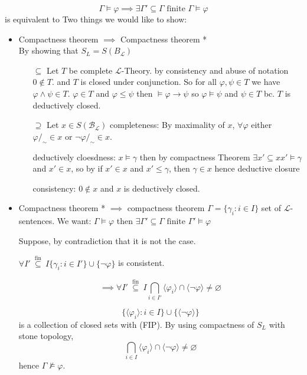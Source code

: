 \[\Gamma \models \varphi \implies \exists \Gamma'\subseteq \Gamma \text{ finite } \Gamma\models \varphi\]
is equivalent to 
Two things we would like to show:
\begin{itemize}
    \item Compactness theorem $\implies$ Compactness theorem *\\
    By showing that $S_L=S(B_\mathcal{L})$
    \begin{claimproof}
        \begin{itemize}
            \item[$\subseteq$] Let $T$ be complete $\mathcal{L}$-Theory. by consistency and abuse of notation $0\notin T$. and $T$ is closed under conjunction.
            So for all $\varphi,\psi\in T$ we have $\varphi\land\psi\in T$.
            $\varphi\in T$ and $\varphi\leq \psi$ then $\models \varphi\to \psi$ so $\varphi\models \psi$ and $\psi\in T$ bc. $T$ is deductively closed.
            \item[$\supseteq$] Let $x\in S(\mathcal{B}_\mathcal{L})$ 
            completeness: By maximality of $x$, $\forall \varphi$ either $\varphi/_\sim \in x$ or $\lnot \varphi/_\sim\in x$.

            deductively cloesdness: $x\models \gamma$ then by compactness Theorem $\exists x'\subseteq x x'\models \gamma$ and $x'\in x$, so by if $x'\in x$ and $x'\leq \gamma$, then $\gamma\in x$ hence deductive closure

            consistency: $0\notin x$ and $x$ is deductively closed.
        \end{itemize}
    \end{claimproof}
    \item Compactness theorem * $\implies$ compactness theorem
    $\Gamma = \{\gamma_i : i\in I\}$ set of $\mathcal{L}$-sentences.
    We want: $\Gamma\models \varphi$ then $\exists \Gamma'\subseteq \Gamma \text{ finite } \Gamma'\models \varphi$

    \begin{claimproof}
        Suppose, by contradiction that it is not the case.

        $\forall I'\stackrel{\text{ fin }}{\subseteq} I \{\gamma_i : i\in I'\}\cup \{\lnot \varphi\}$ is consistent.

        \[\implies \forall I'\stackrel{\text{ fin }}{\subseteq} I \bigcap_{i\in I'} \langle\varphi_i\rangle\cap \langle\lnot \varphi\rangle \neq \varnothing\]

        \[\{\langle\varphi_i\rangle : i\in I\}\cup \{ \langle\lnot \varphi\rangle \}\]
        is a collection of closed sets with (FIP).
        By using compactness of $S_L$ with stone topology,
        \[\bigcap_{i\in I} \langle\varphi_i\rangle\cap \langle\lnot \varphi\rangle \neq \varnothing\]
        hence $\Gamma \not\models \varphi$.
    \end{claimproof}

\end{itemize}


























